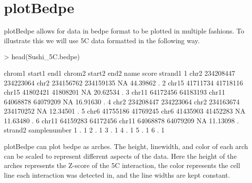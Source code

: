 \documentclass{article}
\begin{document}
\section{plotBedpe}

plotBedpe allows for data in bedpe format to be plotted in multiple fashions.  To illustrate this we will use 5C data formatted in the following way.

\begin{Schunk}
\begin{Sinput}
> head(Sushi_5C.bedpe)
\end{Sinput}
\begin{Soutput}
  chrom1    start1      end1 chrom2    start2      end2 name    score strand1
1   chr2 234208447 234223064   chr2 234156762 234159135   NA 44.39862       .
2  chr15  41711734  41718116  chr15  41802421  41808201   NA 20.62534       .
3  chr11  64172456  64183193  chr11  64068878  64079209   NA 16.91630       .
4   chr2 234208447 234223064   chr2 234163674 234170252   NA 12.34501       .
5   chr6  41755186  41769245   chr6  41435903  41452283   NA 11.63480       .
6  chr11  64159283  64172456  chr11  64068878  64079209   NA 11.13098       .
  strand2 samplenumber
1       .            1
2       .            1
3       .            1
4       .            1
5       .            1
6       .            1
\end{Soutput}
\end{Schunk}

plotBedpe can plot bedpe as arches.  The height, linewidth, and color of each arch can be scaled to represent different aspects of the data.  Here the height of the arches represents the Z-score of the 5C interaction, the color represents the cell line each interaction was detected in, and the line widths are kept constant.
\end{document}
